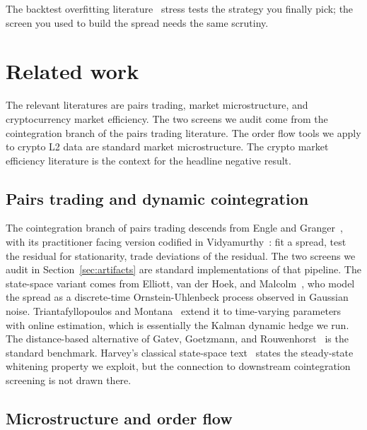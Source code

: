 \documentclass[11pt]{article}
\begin{document}
The backtest overfitting
literature~\cite{bailey2014dsr} stress tests the strategy you finally pick;
the screen you used to build the spread needs the same scrutiny.

\section{Related work}
\label{sec:related}

The relevant literatures are pairs trading, market microstructure, and cryptocurrency market
efficiency. The two screens we audit come from the cointegration branch of the pairs trading
literature. The order flow tools we apply to crypto L2 data are standard market microstructure.
The crypto market efficiency literature is the context for the headline negative result.

\subsection{Pairs trading and dynamic cointegration}
\label{sec:related-pairs}

The cointegration branch of pairs trading descends from Engle and
Granger~\cite{engle1987cointegration}, with its practitioner facing version codified in
Vidyamurthy~\cite{vidyamurthy2004pairs}: fit a spread, test the residual for stationarity,
trade deviations of the residual. The two screens we audit in Section~\ref{sec:artifacts}
are standard implementations of that pipeline. The state-space variant comes from Elliott,
van der Hoek, and Malcolm~\cite{elliott2005pairs}, who model the spread as a discrete-time
Ornstein-Uhlenbeck process observed in Gaussian noise. Triantafyllopoulos and
Montana~\cite{triantafyllopoulos2011dynamic} extend it to time-varying parameters with
online estimation, which is essentially the Kalman dynamic hedge we run. The distance-based
alternative of Gatev, Goetzmann, and Rouwenhorst~\cite{gatev2006pairs} is the standard
benchmark.
Harvey's classical state-space text~\cite{harvey1989structural} states the steady-state
whitening property we exploit, but the connection to downstream cointegration screening is
not drawn there.

\subsection{Microstructure and order flow}
\label{sec:related-micro}
\end{document}

